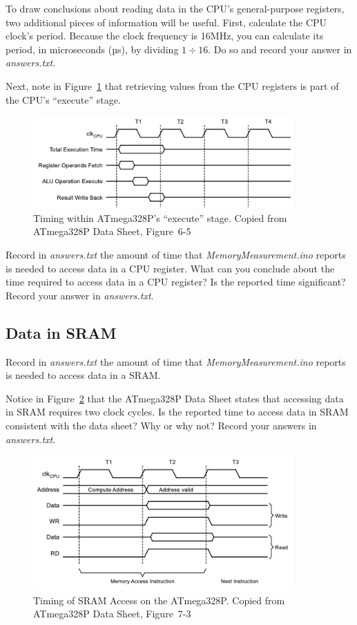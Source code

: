 To draw conclusions about reading data in the CPU's general-purpose registers,
two additional pieces of information will be useful. First, calculate the CPU
clock's period. Because the clock frequency is 16MHz, you can calculate its
period, in microseconds (µs), by dividing $1 \div 16$. Do so and record your
answer in \textit{answers.txt}.

Next, note in Figure~\ref{fig:AluTiming} that retrieving values from
the CPU registers is part of the CPU's ``execute'' stage.

\begin{figure}
    \centering
    \includegraphics[width=10cm]{ATmega328P_AluTiming}
    \caption{Timing within ATmega328P's ``execute'' stage. \tiny Copied from ATmega328P Data Sheet, Figure~6-5 \label{fig:AluTiming}}
\end{figure}

Record in \textit{answers.txt} the amount of time that
\textit{MemoryMeasurement.ino} reports is needed to access data in a CPU
register. What can you conclude about the time required to access data in a CPU
register? Is the reported time significant? Record your answer in
\textit{answers.txt}.

\subsection{Data in SRAM}

Record in \textit{answers.txt} the amount of time that
\textit{MemoryMeasurement.ino} reports is needed to access data in a SRAM.

Notice in Figure~\ref{fig:SramTiming} that the ATmega328P Data Sheet states
that accessing data in SRAM requires two clock cycles. Is the reported time to
access data in SRAM consistent with the data sheet? Why or why not? Record your
answers in \textit{answers.txt}.

\begin{figure}
    \centering
    \includegraphics[width=10cm]{ATmega328P_SramTiming}
    \caption{Timing of SRAM Access on the ATmega328P. \tiny Copied from ATmega328P Data Sheet, Figure~7-3 \label{fig:SramTiming}}
\end{figure}

